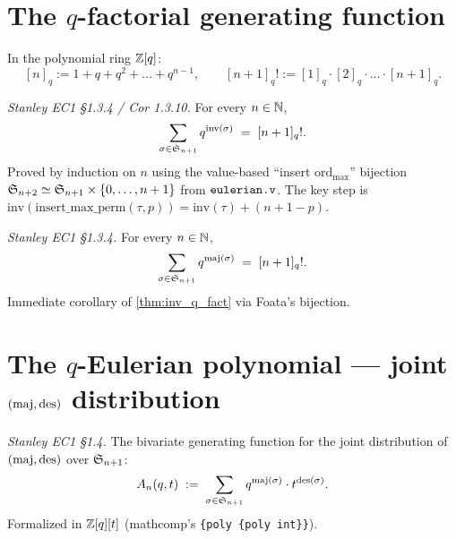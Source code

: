 \section{The $q$-factorial generating function}

\begin{definition}
  \label{def:q_fact}
  \rocqok
  In the polynomial ring $\mathbb{Z}[q]$:
  \[
    [n]_q := 1 + q + q^2 + \dots + q^{n-1},
    \qquad
    [n+1]_q! := [1]_q \cdot [2]_q \cdot \dots \cdot [n+1]_q.
  \]
\end{definition}

\begin{theorem}
  \label{thm:inv_q_fact}
  \rocqok
  \emph{Stanley EC1 §1.3.4 / Cor 1.3.10.}  For every $n \in \mathbb{N}$,
  \[
    \sum_{\sigma \in \mathfrak{S}_{n+1}} q^{\mathrm{inv}(\sigma)} \;=\; [n+1]_q!.
  \]
  Proved by induction on $n$ using the value-based ``insert
  $\mathrm{ord}_{\max}$'' bijection $\mathfrak{S}_{n+2} \simeq \mathfrak{S}_{n+1}
  \times \{0, \dots, n+1\}$ from $\texttt{eulerian.v}$.  The key step is
  $\mathrm{inv}(\mathrm{insert\_max\_perm}(\tau, p)) = \mathrm{inv}(\tau)
  + (n+1 - p)$.
\end{theorem}

\begin{theorem}
  \label{thm:maj_q_fact}
  \rocqok
  \emph{Stanley EC1 §1.3.4.}  For every $n \in \mathbb{N}$,
  \[
    \sum_{\sigma \in \mathfrak{S}_{n+1}} q^{\mathrm{maj}(\sigma)} \;=\; [n+1]_q!.
  \]
  Immediate corollary of \cref{thm:inv_q_fact} via Foata's bijection.
\end{theorem}

\section{The $q$-Eulerian polynomial — joint $(\mathrm{maj},\operatorname{des})$ distribution}

\begin{definition}
  \label{def:q_eul_pol}
  \rocqok
  \emph{Stanley EC1 §1.4.}  The bivariate generating function for the
  joint distribution of $(\mathrm{maj}, \operatorname{des})$ over $\mathfrak{S}_{n+1}$:
  \[
    A_n(q, t) \;:=\; \sum_{\sigma \in \mathfrak{S}_{n+1}}
                     q^{\mathrm{maj}(\sigma)} \cdot t^{\operatorname{des}(\sigma)}.
  \]
  Formalized in $\mathbb{Z}[q][t]$ (mathcomp's \texttt{\{poly \{poly int\}\}}).
\end{definition}

